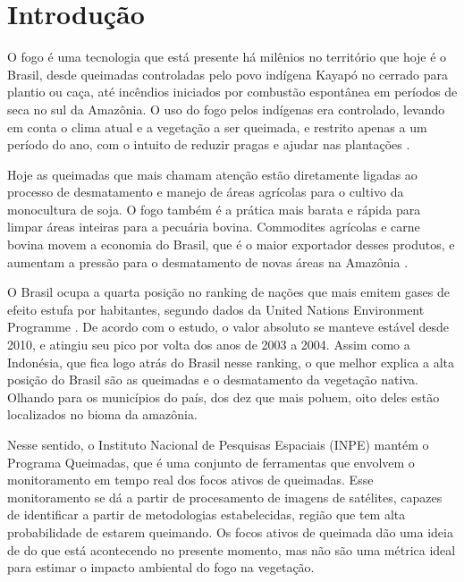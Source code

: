 \documentclass[cic,tc]{iiufrgs}
\begin{document}


\chapter{Introdução}


O fogo é uma tecnologia que está presente há milênios no território que hoje é o Brasil, desde queimadas controladas pelo povo indígena Kayapó no cerrado para plantio ou caça, até incêndios iniciados por combustão espontânea em períodos de seca no sul da Amazônia. O uso do fogo pelos indígenas era controlado, levando em conta o clima atual e a vegetação a ser queimada, e restrito apenas a um período do ano, com o intuito de reduzir pragas e ajudar nas plantações \citep{leonel_2000}.

Hoje as queimadas que mais chamam atenção estão diretamente ligadas ao processo de desmatamento e manejo de áreas agrícolas para o cultivo da monocultura de soja. O fogo também é a prática mais barata e rápida para limpar áreas inteiras para a pecuária bovina. Commodites agrícolas e carne bovina movem a economia do Brasil, que é o maior exportador desses produtos, e aumentam a pressão para o desmatamento de novas áreas na Amazônia \citep{fuchs_2020}.

O Brasil ocupa a quarta posição no ranking de nações que mais emitem gases de efeito estufa por habitantes, segundo dados da United Nations Environment Programme \citet{unep2022}. De acordo com o estudo, o valor absoluto se manteve estável desde 2010, e atingiu seu pico por volta dos anos de 2003 a 2004. Assim como a Indonésia, que fica logo atrás do Brasil nesse ranking, o que melhor explica a alta posição do Brasil são as queimadas e o desmatamento da vegetação nativa. Olhando para os municípios do país, dos dez que mais poluem, oito deles estão localizados no bioma da amazônia.

Nesse sentido, o Instituto Nacional de Pesquisas Espaciais (INPE) mantém o Programa Queimadas, que é uma conjunto de ferramentas que envolvem o monitoramento em tempo real dos focos ativos de queimadas. Esse monitoramento se dá a partir de procesamento de imagens de satélites, capazes de identificar a partir de metodologias estabelecidas, região que tem alta probabilidade de estarem queimando.  Os focos ativos de queimada dão uma ideia de do que está acontecendo no presente momento, mas não são uma métrica ideal para estimar o impacto ambiental do fogo na vegetação.
\end{document}
